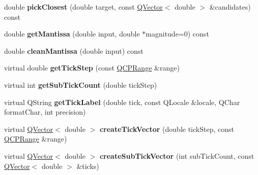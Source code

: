 \begin{DoxyCompactItemize}
\item 
\mbox{\label{class_q_c_p_axis_ticker_a4ea0a7c4ca1c610f92b9bd5944ab4260}} 
double {\bfseries pick\+Closest} (double target, const \hyperlink{class_q_vector}{Q\+Vector}$<$ double $>$ \&candidates) const
\item 
\mbox{\label{class_q_c_p_axis_ticker_a2f1e223bafbf2cec7c3ba8b08d5c77e8}} 
double {\bfseries get\+Mantissa} (double input, double $\ast$magnitude=0) const
\item 
\mbox{\label{class_q_c_p_axis_ticker_ac7df6c72876b7abd67c932663a0b0f6a}} 
double {\bfseries clean\+Mantissa} (double input) const
\item 
\mbox{\label{class_q_c_p_axis_ticker_a4ff8a8bff34993820d3b75b6cdc4a85d}} 
virtual double {\bfseries get\+Tick\+Step} (const \hyperlink{class_q_c_p_range}{Q\+C\+P\+Range} \&range)
\item 
\mbox{\label{class_q_c_p_axis_ticker_aa3703390b2b7a54b8cf0a81d58f75624}} 
virtual int {\bfseries get\+Sub\+Tick\+Count} (double tick\+Step)
\item 
\mbox{\label{class_q_c_p_axis_ticker_ad51fe3f25144d24d84694fb21a2a1222}} 
virtual Q\+String {\bfseries get\+Tick\+Label} (double tick, const Q\+Locale \&locale, Q\+Char format\+Char, int precision)
\item 
\mbox{\label{class_q_c_p_axis_ticker_a861191fe54b81d4d1d6ff21af05af65c}} 
virtual \hyperlink{class_q_vector}{Q\+Vector}$<$ double $>$ {\bfseries create\+Tick\+Vector} (double tick\+Step, const \hyperlink{class_q_c_p_range}{Q\+C\+P\+Range} \&range)
\item 
\mbox{\label{class_q_c_p_axis_ticker_a08dddea0b6a833dcbd9e0b4366814640}} 
virtual \hyperlink{class_q_vector}{Q\+Vector}$<$ double $>$ {\bfseries create\+Sub\+Tick\+Vector} (int sub\+Tick\+Count, const \hyperlink{class_q_vector}{Q\+Vector}$<$ double $>$ \&ticks)
\item 
\mbox{\label{class_q_c_p_axis_ticker_ab1ec5c1c6dad57320d64ceef837b439c}} 

\end{DoxyCompactItemize}
